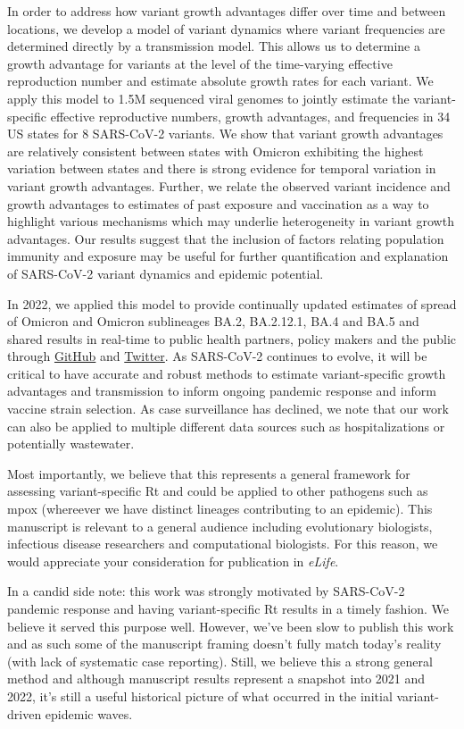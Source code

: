 \documentclass[11pt]{article}
\begin{document}
In order to address how variant growth advantages differ over time and between locations, we develop a model of variant dynamics where variant frequencies are determined directly by a transmission model.
This allows us to determine a growth advantage for variants at the level of the time-varying effective reproduction number and estimate absolute growth rates for each variant.
We apply this model to 1.5M sequenced viral genomes to jointly estimate the variant-specific effective reproductive numbers, growth advantages, and frequencies in 34 US states for 8 SARS-CoV-2 variants.
We show that variant growth advantages are relatively consistent between states with Omicron exhibiting the highest variation between states and there is strong evidence for temporal variation in variant growth advantages.
Further, we relate the observed variant incidence and growth advantages to estimates of past exposure and vaccination as a way to highlight various mechanisms which may underlie heterogeneity in variant growth advantages.
Our results suggest that the inclusion of factors relating population immunity and exposure may be useful for further quantification and explanation of SARS-CoV-2 variant dynamics and epidemic potential.

In 2022, we applied this model to provide continually updated estimates of spread of Omicron and Omicron sublineages BA.2, BA.2.12.1, BA.4 and BA.5 and shared results in real-time to public health partners, policy makers and the public through \href{https://github.com/blab/rt-from-frequency-dynamics}{GitHub} and \href{https://twitter.com/trvrb/status/1530649628625936384}{Twitter}.
As SARS-CoV-2 continues to evolve, it will be critical to have accurate and robust methods to estimate variant-specific growth advantages and transmission to inform ongoing pandemic response and inform vaccine strain selection.
As case surveillance has declined, we note that our work can also be applied to multiple different data sources such as hospitalizations or potentially wastewater.

Most importantly, we believe that this represents a general framework for assessing variant-specific Rt and could be applied to other pathogens such as mpox (whereever we have distinct lineages contributing to an epidemic).
This manuscript is relevant to a general audience including evolutionary biologists, infectious disease researchers and computational biologists.
For this reason, we would appreciate your consideration for publication in \textit{eLife}.

In a candid side note: this work was strongly motivated by SARS-CoV-2 pandemic response and having variant-specific Rt results in a timely fashion.
We believe it served this purpose well.
However, we've been slow to publish this work and as such some of the manuscript framing doesn't fully match today's reality (with lack of systematic case reporting).
Still, we believe this a strong general method and although manuscript results represent a snapshot into 2021 and 2022, it's still a useful historical picture of what occurred in the initial variant-driven epidemic waves.
\end{document}
